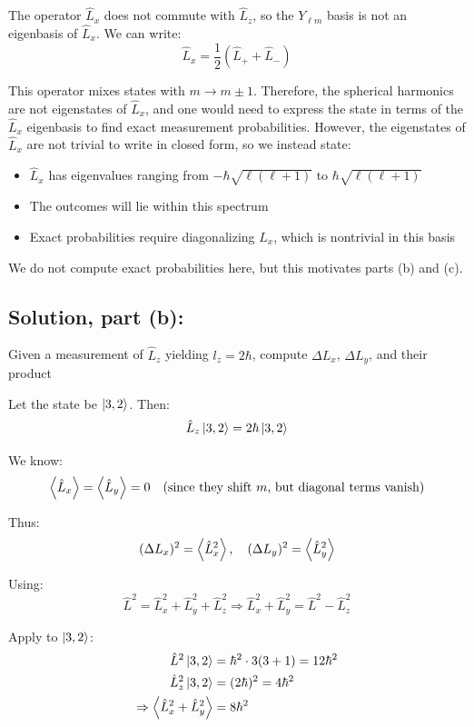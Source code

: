 \documentclass[12pt]{article}
\begin{document}
        The operator \( \hat{L}_x \) does not commute with \( \hat{L}_z \), so the \( Y_{\ell m} \) basis is not an eigenbasis of \( \hat{L}_x \). We can write:
        \[
            \hat{L}_x = \frac{1}{2} \left( \hat{L}_+ + \hat{L}_- \right)
        \]
        
        This operator mixes states with \( m \to m \pm 1 \). Therefore, the spherical harmonics are not eigenstates of \( \hat{L}_x \), and one would need to express the state in terms of the \( \hat{L}_x \) eigenbasis to find exact measurement probabilities. However, the eigenstates of \( \hat{L}_x \) are not trivial to write in closed form, so we instead state:
        \begin{itemize}
            \item \( \hat{L}_x \) has eigenvalues ranging from \( -\hbar \sqrt{\ell(\ell+1)} \) to \( \hbar \sqrt{\ell(\ell+1)} \)
            \item The outcomes will lie within this spectrum
            \item Exact probabilities require diagonalizing \( \hat{L}_x \), which is nontrivial in this basis
        \end{itemize}
        
        We do not compute exact probabilities here, but this motivates parts (b) and (c).

    \subsection{Solution, part (b):}
        Given a measurement of \( \hat{L}_z \) yielding \( l_z = 2\hbar \), compute \( \Delta L_x \), \( \Delta L_y \), and their product

        Let the state be \( \ket{3,2} \). Then:
        \[
            \hat{L}_z \ket{3,2} = 2\hbar \ket{3,2}
        \]
        
        We know:
        \[
            \ev{\hat{L}_x} = \ev{\hat{L}_y} = 0 \quad \text{(since they shift \( m \), but diagonal terms vanish)}
        \]
        
        Thus:
        \[
            (\Delta L_x)^2 = \ev{\hat{L}_x^2}, \quad (\Delta L_y)^2 = \ev{\hat{L}_y^2}
        \]
        
        Using:
        \[
            \hat{L}^2 = \hat{L}_x^2 + \hat{L}_y^2 + \hat{L}_z^2 \Rightarrow \hat{L}_x^2 + \hat{L}_y^2 = \hat{L}^2 - \hat{L}_z^2
        \]
        
        Apply to \( \ket{3,2} \):
        \[
            \begin{aligned}
                \hat{L}^2 \ket{3,2} &= \hbar^2 \cdot 3(3+1) = 12\hbar^2 \\
                \hat{L}_z^2 \ket{3,2} &= (2\hbar)^2 = 4\hbar^2 \\
                \Rightarrow \ev{\hat{L}_x^2 + \hat{L}_y^2} &= 8\hbar^2
            \end{aligned}
        \]
        
\end{document}
